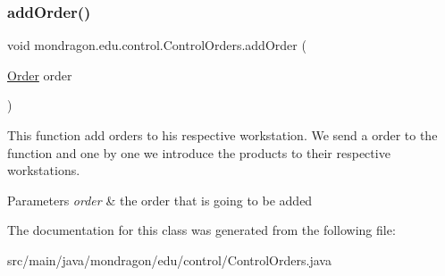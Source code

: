 \subsubsection{\texorpdfstring{addOrder()}{addOrder()}}
{\footnotesize\ttfamily void mondragon.\+edu.\+control.\+Control\+Orders.\+add\+Order (\begin{DoxyParamCaption}\item[{\mbox{\hyperlink{classmondragon_1_1edu_1_1clases_1_1_order}{Order}}}]{order }\end{DoxyParamCaption})\hspace{0.3cm}{\ttfamily [inline]}}

This function add orders to his respective workstation. We send a order to the function and one by one we introduce the products to their respective workstations.


\begin{DoxyParams}{Parameters}
{\em order} & the order that is going to be added \\
\hline
\end{DoxyParams}


The documentation for this class was generated from the following file\+:\begin{DoxyCompactItemize}
\item 
src/main/java/mondragon/edu/control/Control\+Orders.\+java\end{DoxyCompactItemize}
